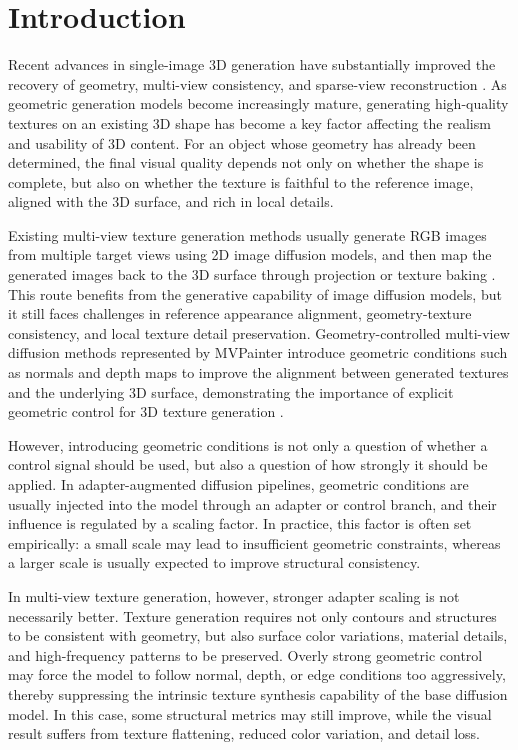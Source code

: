 \documentclass[times,twocolumn,final]{elsarticle}
\begin{document}
\linenumbers

\section{Introduction}
\label{sec:intro}

Recent advances in single-image 3D generation have substantially improved the recovery of geometry, multi-view consistency, and sparse-view reconstruction \cite{liu2023zero1to3,shi2023zero123pp,liu2023syncdreamer,long2023wonder3d,shi2024mvdream,wang2023imagedream,xu2024instantmesh,ke2024era3d}. As geometric generation models become increasingly mature, generating high-quality textures on an existing 3D shape has become a key factor affecting the realism and usability of 3D content. For an object whose geometry has already been determined, the final visual quality depends not only on whether the shape is complete, but also on whether the texture is faithful to the reference image, aligned with the 3D surface, and rich in local details.

Existing multi-view texture generation methods usually generate RGB images from multiple target views using 2D image diffusion models, and then map the generated images back to the 3D surface through projection or texture baking \cite{chen2023text2tex,richardson2023texture,poole2023dreamfusion,chen2023fantasia3d}. This route benefits from the generative capability of image diffusion models, but it still faces challenges in reference appearance alignment, geometry-texture consistency, and local texture detail preservation. Geometry-controlled multi-view diffusion methods represented by MVPainter introduce geometric conditions such as normals and depth maps to improve the alignment between generated textures and the underlying 3D surface, demonstrating the importance of explicit geometric control for 3D texture generation \cite{shao2025mvpainter}.

However, introducing geometric conditions is not only a question of whether a control signal should be used, but also a question of how strongly it should be applied. In adapter-augmented diffusion pipelines, geometric conditions are usually injected into the model through an adapter or control branch, and their influence is regulated by a scaling factor. In practice, this factor is often set empirically: a small scale may lead to insufficient geometric constraints, whereas a larger scale is usually expected to improve structural consistency.

In multi-view texture generation, however, stronger adapter scaling is not necessarily better. Texture generation requires not only contours and structures to be consistent with geometry, but also surface color variations, material details, and high-frequency patterns to be preserved. Overly strong geometric control may force the model to follow normal, depth, or edge conditions too aggressively, thereby suppressing the intrinsic texture synthesis capability of the base diffusion model. In this case, some structural metrics may still improve, while the visual result suffers from texture flattening, reduced color variation, and detail loss.
\end{document}
